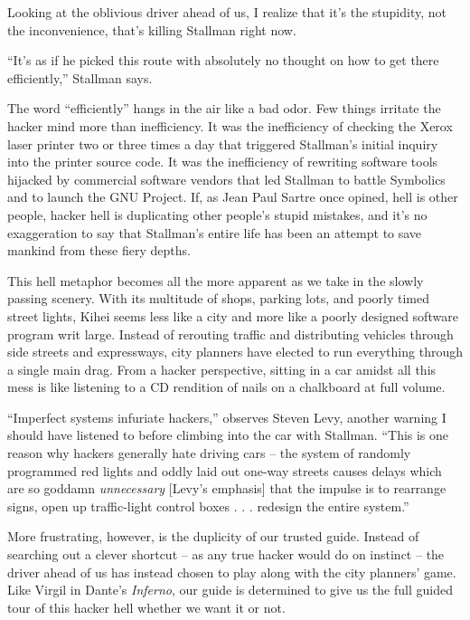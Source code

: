 Looking at the oblivious driver ahead of us, I realize that it's the stupidity, not the inconvenience, that's killing Stallman right now.

``It's as if he picked this route with absolutely no thought on how to get there efficiently,'' Stallman says.

The word ``efficiently'' hangs in the air like a bad odor. Few things irritate the hacker mind more than inefficiency. It was the inefficiency of checking the Xerox laser printer two or three times a day that triggered Stallman's initial inquiry into the printer source code. It was the inefficiency of rewriting software tools hijacked by commercial software vendors that led Stallman to battle Symbolics and to launch the GNU Project. If, as Jean Paul Sartre once opined, hell is other people, hacker hell is duplicating other people's stupid mistakes, and it's no exaggeration to say that Stallman's entire life has been an attempt to save mankind from these fiery depths.

This hell metaphor becomes all the more apparent as we take in the slowly passing scenery. With its multitude of shops, parking lots, and poorly timed street lights, Kihei seems less like a city and more like a poorly designed software program writ large. Instead of rerouting traffic and distributing vehicles through side streets and expressways, city planners have elected to run everything through a single main drag. From a hacker perspective, sitting in a car amidst all this mess is like listening to a CD rendition of nails on a chalkboard at full volume.

``Imperfect systems infuriate hackers,'' observes Steven Levy, another warning I should have listened to before climbing into the car with Stallman. ``This is one reason why hackers generally hate driving cars -- the system of randomly programmed red lights and oddly laid out one-way streets causes delays which are so goddamn \textit{unnecessary} [Levy's emphasis] that the impulse is to rearrange signs, open up traffic-light control boxes . . . redesign the entire system.''

More frustrating, however, is the duplicity of our trusted guide. Instead of searching out a clever shortcut -- as any true hacker would do on instinct -- the driver ahead of us has instead chosen to play along with the city planners' game. Like Virgil in Dante's \textit{Inferno}, our guide is determined to give us the full guided tour of this hacker hell whether we want it or not.

